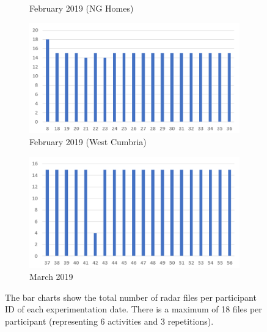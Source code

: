 \documentclass{l4proj}
\begin{document}
\begin{appendices}
\begin{figure}[h]
\begin{subfigure}[b]{0.43\textwidth}
        \caption{February 2019 (NG Homes)}
        \label{fig:dataset-february2019}
    \end{subfigure}
    \hfill
    \begin{subfigure}[b]{0.43\textwidth}
        \includegraphics[width=\textwidth]{images/dataset-february2019_2.png}
        \caption{February 2019 (West Cumbria)}
        \label{fig:dataset-february2019_2}
    \end{subfigure}
    \hfill
    \begin{subfigure}[b]{0.43\textwidth}
        \includegraphics[width=\textwidth]{images/dataset-march2019.png}
        \caption{March 2019}
        \label{fig:dataset-march2019}
    \end{subfigure}
  \caption{The bar charts show the total number of radar files per participant ID of each experimentation date. There is a maximum of 18 files per participant (representing 6 activities and 3 repetitions).}
  \label{fig:full-dataset-information}
\end{figure}

\newpage


\end{appendices}
\end{document}
